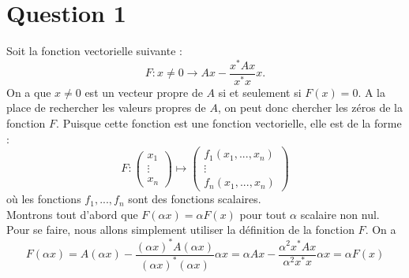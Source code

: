 \section*{Question 1}
Soit la fonction vectorielle suivante : $$F : x \neq 0 \rightarrow Ax - \frac{x^{*}Ax}{x^*x}x.$$
On a que $x \neq 0$ est un vecteur propre de $A$ si et seulement si $F(x)=0$. A la place de rechercher les valeurs propres de $A$, on peut donc chercher les zéros de la fonction $F$. Puisque cette fonction est une fonction vectorielle, elle est de la forme : 
$$F : 
\left(\begin{array}{c}
x_1 \\
\vdots \\
x_n
\end{array}\right)
\longmapsto
\left(\begin{array}{c}
f_1(x_1,...,x_n) \\
\vdots \\
f_n(x_1,...,x_n)
\end{array}\right)
$$
où les fonctions $f_1,...,f_n$ sont des fonctions scalaires.\\
Montrons tout d'abord que $F(\alpha x) = \alpha F(x)$ pour tout $\alpha$ scalaire non nul.\\
Pour se faire, nous allons simplement utiliser la définition de la fonction $F$. On a $$F(\alpha x) = A(\alpha x) - \frac{(\alpha x)^*A(\alpha x)}{(\alpha x)^*(\alpha x)}\alpha x = \alpha Ax - \frac{\alpha^2 x^* A x}{\alpha^2 x^* x}\alpha x = \alpha F(x)$$

